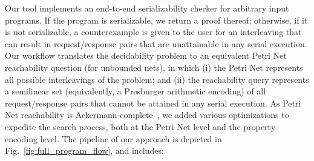 %
%
%
%
Our tool implements an end-to-end serializability checker for arbitrary input programs. If the program is serializable, we return a proof thereof; otherwise, if it is not serializable, a counterexample is given to the user for an interleaving that can result in request/response pairs that are unattainable in any serial execution.
%
Our workflow translates the decidability problem to an equivalent Petri Net reachability question (for unbounded nets), in which (i) the Petri Net represents all possible interleavings of the problem; and (ii) the reachability query represents a semilinear set (equivalently, a Presburger arithmetic encoding) of all request/response pairs that cannot be attained in any serial execution.
%
As Petri Net reachability is Ackermann-complete~\cite{CzWo22}, we added various optimizations to expedite the search process, both at the Petri Net level and the property-encoding level.
%
The pipeline of our approach is depicted in Fig.~\ref{fig:full_program_flow}, and includes:
 

